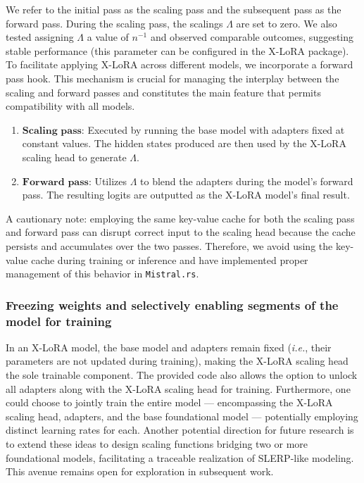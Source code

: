 We refer to the initial pass as the scaling pass and the subsequent pass as the forward pass. During the scaling pass, the scalings $\Lambda$ are set to zero. We also tested assigning $\Lambda$ a value of ${n}^{-1}$ and observed comparable outcomes, suggesting stable performance (this parameter can be configured in the X-LoRA package). To facilitate applying X-LoRA across different models, we incorporate a forward pass hook. This mechanism is crucial for managing the interplay between the scaling and forward passes and constitutes the main feature that permits compatibility with all models.

\begin{enumerate}
    \item $\mathbf{Scaling}$ $\mathbf{pass}$: Executed by running the base model with adapters fixed at constant values. The hidden states produced are then used by the X-LoRA scaling head to generate $\Lambda$.
    \item $\mathbf{Forward}$ $\mathbf{pass}$: Utilizes $\Lambda$ to blend the adapters during the model’s forward pass. The resulting logits are outputted as the X-LoRA model’s final result.
\end{enumerate}

A cautionary note: employing the same key-value cache for both the scaling pass and forward pass can disrupt correct input to the scaling head because the cache persists and accumulates over the two passes. Therefore, we avoid using the key-value cache during training or inference and have implemented proper management of this behavior in \texttt{Mistral.rs}.

\subsubsection{Freezing weights and selectively enabling segments of the model for training} In an X-LoRA model, the base model and adapters remain fixed ({\it i.e.}, their parameters are not updated during training), making the X-LoRA scaling head the sole trainable component. The provided code also allows the option to unlock all adapters along with the X-LoRA scaling head for training. Furthermore, one could choose to jointly train the entire model — encompassing the X-LoRA scaling head, adapters, and the base foundational model — potentially employing distinct learning rates for each. Another potential direction for future research is to extend these ideas to design scaling functions bridging two or more foundational models, facilitating a traceable realization of SLERP-like modeling. This avenue remains open for exploration in subsequent work.

